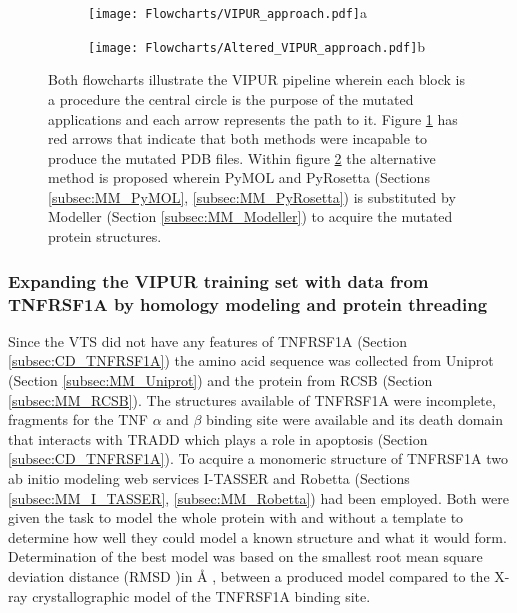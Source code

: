 	\begin{figure}[!ht]
		\centering
		\begin{subfigure}{0.45\textwidth}
			\texttt{[image: Flowcharts/VIPUR\_approach.pdf]}{a}
			\label{fig:RES_VIPUR_approach}
		\end{subfigure}
		\begin{subfigure}{0.45\textwidth}
			\texttt{[image: Flowcharts/Altered\_VIPUR\_approach.pdf]}{b}
			\label{fig:RES_Altered_VIPUR_approach}
		\end{subfigure}
		\caption[Flowcharts VIPUR pipeline and altered VIPUR pipeline]{Both flowcharts illustrate the VIPUR pipeline wherein each block is a procedure the central circle is the purpose of the mutated applications and each arrow represents the path to it. Figure \ref{fig:RES_VIPUR_approach} has red arrows that indicate that both methods were incapable to produce the mutated PDB files. Within figure \ref{fig:RES_Altered_VIPUR_approach} the alternative method is proposed wherein PyMOL and PyRosetta (Sections \ref{subsec:MM_PyMOL}, \ref{subsec:MM_PyRosetta}) is substituted by Modeller (Section \ref{subsec:MM_Modeller}) to acquire the mutated protein structures.}

		\label{fig:Flowcharts_of_old_and_altered_VIPUR}
	\end{figure}
	\label{subsubsec:RES_Incompatibility}
	\newpage
	
	\subsubsection{Expanding the VIPUR training set with data from TNFRSF1A by homology modeling and protein threading}
	Since the VTS did not have any features of TNFRSF1A (Section \ref{subsec:CD_TNFRSF1A}) the amino acid sequence was collected from Uniprot (Section \ref{subsec:MM_Uniprot}) and the protein from RCSB (Section \ref{subsec:MM_RCSB}). The structures available of TNFRSF1A were incomplete, fragments for the TNF $\alpha$ and $\beta$ binding site \cite{} were available and its death domain that interacts with TRADD \cite{} which plays a role in apoptosis (Section \ref{subsec:CD_TNFRSF1A}). To acquire a monomeric structure of TNFRSF1A two ab initio modeling web services I-TASSER and Robetta (Sections \ref{subsec:MM_I_TASSER}, \ref{subsec:MM_Robetta}) had been employed. Both were given the task to model the whole protein with and without a template to determine how well they could model a known structure and what it would form. Determination of the best model was based on the smallest root mean square deviation distance (RMSD )in {\AA} , between a produced model compared to the X-ray crystallographic model of the TNFRSF1A binding site.
	
